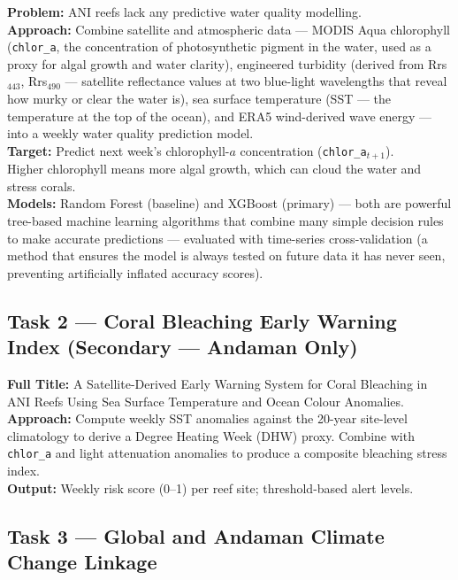 \documentclass[12pt,a4paper]{report}
\begin{document}
\begin{infobox}
\textbf{Problem:} ANI reefs lack any predictive water quality modelling.\\[4pt]
\textbf{Approach:} Combine satellite and atmospheric data — MODIS Aqua chlorophyll
(\texttt{chlor\_a}, the concentration of photosynthetic pigment in the water, used as a
proxy for algal growth and water clarity), engineered turbidity (derived from
Rrs$_{443}$, Rrs$_{490}$ — satellite reflectance values at two blue-light wavelengths
that reveal how murky or clear the water is), sea surface temperature (SST — the
temperature at the top of the ocean), and ERA5 wind-derived wave energy — into a
weekly water quality prediction model.\\[4pt]
\textbf{Target:} Predict next week's chlorophyll-$a$ concentration (\texttt{chlor\_a}$_{t+1}$).\\ 
Higher chlorophyll means more algal growth, which can cloud the water and stress corals.\\[4pt]
\textbf{Models:} Random Forest (baseline) and XGBoost (primary) — both are powerful
tree-based machine learning algorithms that combine many simple decision rules to make
accurate predictions — evaluated with time-series cross-validation (a method that
ensures the model is always tested on future data it has never seen, preventing
artificially inflated accuracy scores).
\end{infobox}

\subsection*{Task 2 — Coral Bleaching Early Warning Index (Secondary — Andaman Only)}

\begin{infobox}
\textbf{Full Title:} A Satellite-Derived Early Warning System for Coral Bleaching in ANI
Reefs Using Sea Surface Temperature and Ocean Colour Anomalies.\\[4pt]
\textbf{Approach:} Compute weekly SST anomalies against the 20-year site-level climatology
to derive a Degree Heating Week (DHW) proxy. Combine with \texttt{chlor\_a} and light
attenuation anomalies to produce a composite bleaching stress index.\\[4pt]
\textbf{Output:} Weekly risk score (0--1) per reef site; threshold-based alert levels.
\end{infobox}

\subsection*{Task 3 — Global and Andaman Climate Change Linkage}
\end{document}

